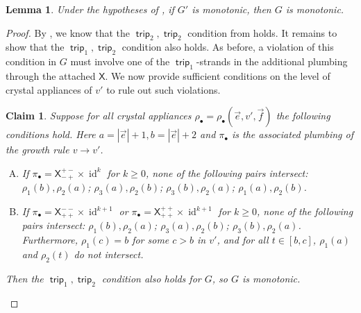 \documentclass{amsart}
\newtheorem{lemma}[theorem]{Lemma}
\newtheorem*{claim}{Claim}
\theoremstyle{definition}
\theoremstyle{remark}
\numberwithin{equation}{section}
\DeclareMathOperator{\trip}{\mathsf{trip}}
\DeclareMathOperator{\id}{id}
\DeclareMathOperator{\prom}{\mathsf{prom}}
\begin{document}
\begin{lemma}\label{lem:growth-rules-monotonic-mostly}
  Under the hypotheses of , if $G'$ is monotonic, then $G$ is monotonic.
\end{lemma}

\begin{proof}
  By , we know that the $\trip_2, \trip_2$ condition from  holds. It remains to show that the $\trip_1, \trip_2$ condition also holds. As before, a violation of this condition in $G$ must involve one of the $\trip_1$-strands in the additional plumbing through the attached $\mathsf{X}$. We now provide sufficient conditions on the level of crystal appliances of $v'$ to rule out such violations.
  

  \begin{claim}
  Suppose for all crystal appliances $\rho_\bullet = \rho_\bullet(\vec{e}, v', \vec{f})$ the following conditions hold.  Here $a=|\vec{e}|+1, b=|\vec{e}|+2$ and $\pi_\bullet$ is the associated plumbing of the growth rule $v \to v'$.
  \begin{enumerate}[(A)]
    \item If $\pi_\bullet = \mathsf{X}^{+-}_{-+} \times \id^k$ for $k \geq 0$, none of the following pairs intersect: $\rho_1(b), \rho_2(a)$; $\rho_3(a), \rho_2(b)$; $\rho_3(b), \rho_2(a)$; $\rho_1(a), \rho_2(b)$.
    \item If $\pi_\bullet = \mathsf{X}^{--}_{++} \times \id^{k+1}$ or $\pi_\bullet = \mathsf{X}^{++}_{++} \times \id^{k+1}$  for $k \geq 0$, none of the following pairs intersect: $\rho_1(b), \rho_2(a)$; $\rho_3(a), \rho_2(b)$; $\rho_3(b), \rho_2(a)$. Furthermore, $\rho_1(c) = b$ for some $c > b$ in $v'$, and for all $t \in [b, c]$, $\rho_1(a)$ and $\rho_2(t)$ do not intersect.
  \end{enumerate}
Then the $\trip_1, \trip_2$ condition also holds for $G$, so $G$ is monotonic.
\end{claim}


\end{proof}
\end{document}
